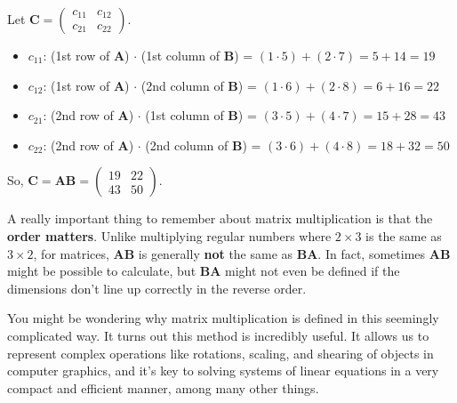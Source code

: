 \documentclass[11pt]{article}
\begin{document}
Let $\mathbf{C} = \begin{pmatrix} c_{11} & c_{12} \\ c_{21} & c_{22} \end{pmatrix}$.
\begin{itemize}
    \item $c_{11}$: (1st row of $\mathbf{A}$) $\cdot$ (1st column of $\mathbf{B}$) = $(1 \cdot 5) + (2 \cdot 7) = 5 + 14 = 19$
    \item $c_{12}$: (1st row of $\mathbf{A}$) $\cdot$ (2nd column of $\mathbf{B}$) = $(1 \cdot 6) + (2 \cdot 8) = 6 + 16 = 22$
    \item $c_{21}$: (2nd row of $\mathbf{A}$) $\cdot$ (1st column of $\mathbf{B}$) = $(3 \cdot 5) + (4 \cdot 7) = 15 + 28 = 43$
    \item $c_{22}$: (2nd row of $\mathbf{A}$) $\cdot$ (2nd column of $\mathbf{B}$) = $(3 \cdot 6) + (4 \cdot 8) = 18 + 32 = 50$
\end{itemize}
So, $\mathbf{C} = \mathbf{A}\mathbf{B} = \begin{pmatrix} 19 & 22 \\ 43 & 50 \end{pmatrix}$.

A really important thing to remember about matrix multiplication is that the \textbf{order matters}. Unlike multiplying regular numbers where $2 \times 3$ is the same as $3 \times 2$, for matrices, $\mathbf{A}\mathbf{B}$ is generally \textbf{not} the same as $\mathbf{B}\mathbf{A}$.  In fact, sometimes $\mathbf{A}\mathbf{B}$ might be possible to calculate, but $\mathbf{B}\mathbf{A}$ might not even be defined if the dimensions don't line up correctly in the reverse order.

You might be wondering why matrix multiplication is defined in this seemingly complicated way. It turns out this method is incredibly useful. It allows us to represent complex operations like rotations, scaling, and shearing of objects in computer graphics, and it's key to solving systems of linear equations in a very compact and efficient manner, among many other things.
\end{document}

